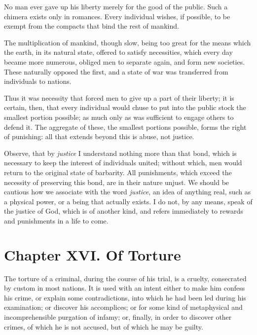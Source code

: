 No man ever gave up his liberty merely for the good of the public.
Such a chimera exists only in romances. Every individual wishes, if
possible, to be exempt from the compacts that bind the rest of
mankind.

The multiplication of mankind, though slow, being too great for the
means which the earth, in its natural state, offered to satisfy
necessities, which every day became more numerous, obliged men to
separate again, and form new societies. These naturally opposed the
first, and a state of war was transferred from individuals to nations.

Thus it was necessity that forced men to give up a part of their
liberty; it is certain, then, that every individual would chuse to put
into the public stock the smallest portion possible; as much only as
was sufficient to engage others to defend it. The aggregate of these,
the smallest portions possible, forms the right of punishing: all that
extends beyond this is abuse, not justice.

Observe, that by \textit{justice} I understand nothing more than that
bond, which is necessary to keep the interest of individuals united;
without which, men would return to the original state of barbarity.
All punishments, which exceed the necessity of  preserving
this bond, are in their nature unjust. We should be cautious how we
associate with the word \textit{justice}, an idea of anything real,
such as a physical power, or a being that actually exists. I do not,
by any means, speak of the justice of God, which is of another kind,
and refers immediately to rewards and punishments in a life to come.

\section{Chapter XVI. Of Torture}

The torture of a criminal, during the course of his trial, is a
cruelty, consecrated by custom in most nations. It is used with an
intent either to make him confess his crime, or explain some
contradictions, into which he had been led during his examination; or
discover his accomplices; or for some kind of metaphysical and
incomprehensible purgation of infamy; or, finally, in order to
discover other crimes, of which he is not accused, but of which he may
be guilty.

